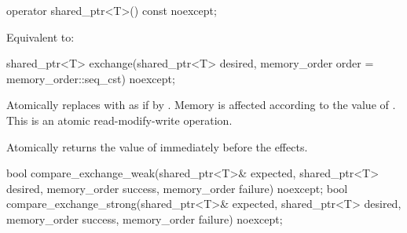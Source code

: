 %
\begin{itemdecl}
operator shared_ptr<T>() const noexcept;
\end{itemdecl}

\begin{itemdescr}
\pnum
\effects
Equivalent to: 
\end{itemdescr}

%
\begin{itemdecl}
shared_ptr<T> exchange(shared_ptr<T> desired, memory_order order = memory_order::seq_cst) noexcept;
\end{itemdecl}

\begin{itemdescr}
\pnum
\effects
Atomically replaces  with 
as if by .
Memory is affected according to the value of .
This is an atomic read-modify-write operation.

\pnum
\returns
Atomically returns the value of  immediately before the effects.
\end{itemdescr}

%
%
\begin{itemdecl}
bool compare_exchange_weak(shared_ptr<T>& expected, shared_ptr<T> desired,
                           memory_order success, memory_order failure) noexcept;
bool compare_exchange_strong(shared_ptr<T>& expected, shared_ptr<T> desired,
                             memory_order success, memory_order failure) noexcept;
\end{itemdecl}

